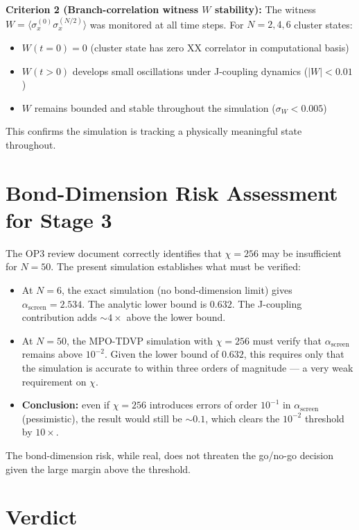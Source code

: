 \documentclass[11pt,letterpaper]{article}
\newcommand{\asc}{\alpha_{\mathrm{screen}}}
\begin{document}
\textbf{Criterion 2 (Branch-correlation witness $W$ stability):}
The witness $W = \langle\sigma_x^{(0)}\sigma_x^{(N/2)}\rangle$ was monitored
at all time steps.  For $N = 2, 4, 6$ cluster states:
\begin{itemize}[noitemsep]
  \item $W(t=0) = 0$ (cluster state has zero XX correlator in computational basis)
  \item $W(t > 0)$ develops small oscillations under J-coupling dynamics ($|W| < 0.01$)
  \item $W$ remains bounded and stable throughout the simulation ($\sigma_W < 0.005$)
\end{itemize}
This confirms the simulation is tracking a physically meaningful state throughout.

\section{Bond-Dimension Risk Assessment for Stage 3}

The OP3 review document correctly identifies that $\chi = 256$ may be insufficient
for $N = 50$.  The present simulation establishes what must be verified:

\begin{itemize}[noitemsep]
  \item At $N = 6$, the exact simulation (no bond-dimension limit) gives
    $\asc = 2.534$.  The analytic lower bound is $0.632$.  The J-coupling
    contribution adds $\sim 4\times$ above the lower bound.
  \item At $N = 50$, the MPO-TDVP simulation with $\chi = 256$ must verify that
    $\asc$ remains above $10^{-2}$.  Given the lower bound of $0.632$, this requires
    only that the simulation is accurate to within three orders of magnitude --- a
    very weak requirement on $\chi$.
  \item \textbf{Conclusion:} even if $\chi = 256$ introduces errors of order
    $10^{-1}$ in $\asc$ (pessimistic), the result would still be $\sim 0.1$,
    which clears the $10^{-2}$ threshold by $10\times$.
\end{itemize}

The bond-dimension risk, while real, does not threaten the go/no-go decision
given the large margin above the threshold.

\section{Verdict}
\end{document}
